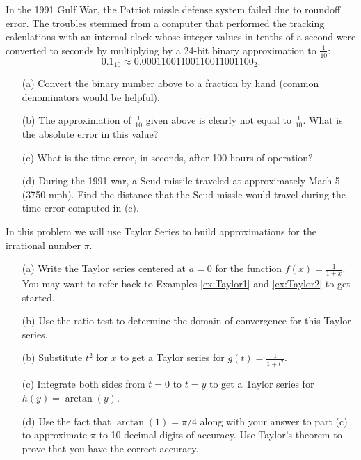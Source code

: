 \begin{problem}
    In the 1991 Gulf War, the Patriot missle defense system failed due to roundoff error.
    The troubles stemmed from a computer that performed the tracking calculations with an
    internal clock whose integer values in tenths of a second were converted to seconds by
    multiplying by a 24-bit binary approximation to $\frac{1}{10}$:
    \[ 0.1_{10} \approx 0.00011001100110011001100_2. \]
    \begin{enumerate}
        \item[(a)] Convert the binary number above to a fraction by hand (common
            denominators would be helpful).
        \item[(b)] The approximation of $\frac{1}{10}$ given above is clearly not equal to
            $\frac{1}{10}$.  What is the absolute error in this value?
        \item[(c)] What is the time error, in seconds, after 100 hours of operation?
        \item[(d)] During the 1991 war, a Scud missile traveled at approximately Mach 5
            (3750 mph).  Find the distance that the Scud missle would travel during the
            time error computed in (c).
    \end{enumerate}
\end{problem}


\begin{problem}[Approximating $\pi$]
    In this problem we will use Taylor Series to build approximations for the irrational
    number $\pi$.
    \begin{enumerate}
        \item[(a)] Write the Taylor series centered at $a=0$ for the function $f(x) =
            \frac{1}{1+x}$.  You may want to refer back to Examples \ref{ex:Taylor1} and
            \ref{ex:Taylor2} to get started.
        \item[(b)] Use the ratio test to determine the domain of convergence for this
            Taylor series.
        \item[(b)] Substitute $t^2$ for $x$ to get a Taylor series for $g(t) =
            \frac{1}{1+t^2}$.
        \item[(c)] Integrate both sides from $t=0$ to $t=y$ to get a Taylor series for
            $h(y) = \arctan(y)$.
        \item[(d)] Use the fact that $\arctan(1) = \pi/4$ along with your answer
            to part (c) to approximate $\pi$ to 10 decimal digits of accuracy.  Use
            Taylor's theorem to prove that you have the correct accuracy.
    \end{enumerate}
\end{problem}

